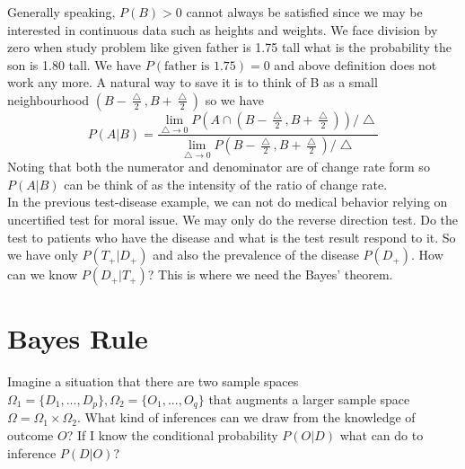 \documentclass[11pt]{article}
\begin{document}
\begin{intuition}
Generally speaking, $P(B)>0$ cannot always be satisfied since we may be interested in continuous data such as heights and weights. We face division by zero when study problem like given father is 1.75 tall what is the probability the son is 1.80 tall. We have $P(\text{father is 1.75})=0$ and above definition does not work any more. A natural way to save it is to think of B as a small neighbourhood $(B-\frac{\bigtriangleup}{2},B+\frac{\bigtriangleup}{2})$ so we have $$P(A|B)=\frac{\lim_{\bigtriangleup\rightarrow 0} P(A\cap (B-\frac{\bigtriangleup}{2},B+\frac{\bigtriangleup}{2}) )/\bigtriangleup}{\lim_{\bigtriangleup\rightarrow 0}P(B-\frac{\bigtriangleup}{2},B+\frac{\bigtriangleup}{2})/\bigtriangleup}$$  
Noting that both the numerator and denominator are of change rate form so $P(A|B)$ can be think of as the intensity of the ratio of change rate.\\
In the previous test-disease example, we can not do medical behavior  relying on uncertified test for moral issue. We may only do the reverse direction test. Do the test to patients who have the disease and what is the test result respond to it. So we have only $P(T_+|D_+)$ and also the prevalence of the disease $P(D_+)$. How can we know  $P(D_+|T_+)$? This is where we need the Bayes' theorem.  
\end{intuition}


\section{Bayes Rule}
Imagine a situation that there are two sample spaces $\Omega_1 = \{D_1,...,D_p\},\Omega_2 = \{O_1,...,O_q\}$ that augments a larger sample space $\Omega=\Omega_1\times\Omega_2$. What kind of inferences can we draw from the knowledge of outcome $O$? If I know the conditional probability $P(O|D)$ what can do to inference $P(D|O)$?
\end{document}
